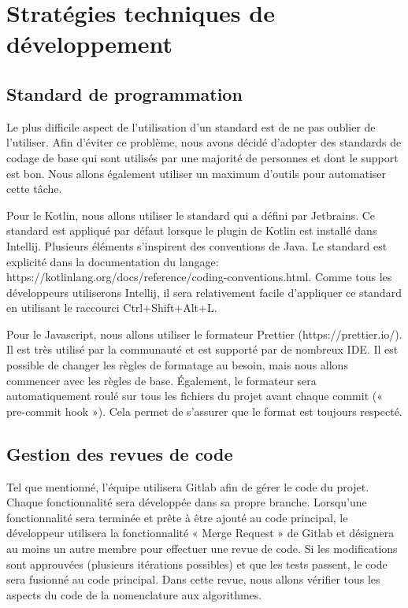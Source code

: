 \section{Stratégies techniques de développement}
	\subsection{Standard de programmation}
	Le plus difficile aspect de l’utilisation d’un standard est de ne pas oublier de l’utiliser. Afin d’éviter ce problème, nous avons décidé d’adopter des standards de codage de base qui sont utilisés par une majorité de personnes et dont le support est bon. Nous allons également utiliser un maximum d’outils pour automatiser cette tâche.

	Pour le Kotlin, nous allons utiliser le standard qui a défini par Jetbrains. Ce standard est appliqué par défaut lorsque le plugin de Kotlin est installé dans Intellij. Plusieurs éléments s’inspirent des conventions de Java. Le standard est explicité dans la documentation du langage: https://kotlinlang.org/docs/reference/coding-conventions.html. Comme tous les développeurs utiliserons Intellij, il sera relativement facile d’appliquer ce standard en utilisant le raccourci Ctrl+Shift+Alt+L.

	Pour le Javascript, nous allons utiliser le formateur Prettier (https://prettier.io/). Il est très utilisé par la communauté et est supporté par de nombreux IDE. Il est possible de changer les règles de formatage au besoin, mais nous allons commencer avec les règles de base. Également, le formateur sera automatiquement roulé sur tous les fichiers du projet avant chaque commit (« pre-commit hook »). Cela permet de s’assurer que le format est toujours respecté. 
	\subsection{Gestion des revues de code}
	Tel que mentionné, l’équipe utilisera Gitlab afin de gérer le code du projet. Chaque fonctionnalité sera développée dans sa propre branche. Lorsqu’une fonctionnalité sera terminée et prête à être ajouté au code principal, le développeur utilisera la fonctionnalité « Merge Request » de Gitlab et désignera au moins un autre membre pour effectuer une revue de code. Si les modifications sont approuvées (plusieurs itérations possibles) et que les tests passent, le code sera fusionné au code principal. Dans cette revue, nous allons vérifier tous les aspects du code de la nomenclature aux algorithmes. 

